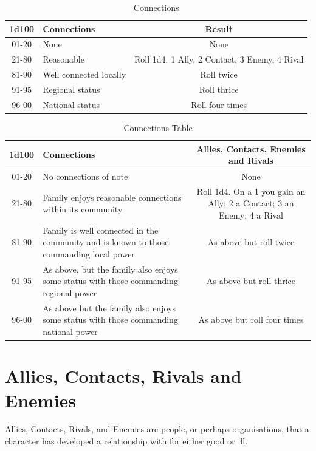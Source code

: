 \documentclass[10pt]{article}
\begin{document}
\begin{longtable}{|c|l|c|}
\caption{Connections}
\label{tab:connections}\\
\hline
\textbf{1d100} & \textbf{Connections} & \textbf{Result} \\
\hline
01-20 & None & None \\
\hline
21-80 & Reasonable & Roll 1d4: 1 Ally, 2 Contact, 3 Enemy, 4 Rival \\
\hline
81-90 & Well connected locally & Roll twice \\
\hline
91-95 & Regional status & Roll thrice \\
\hline
96-00 & National status & Roll four times \\
\hline
\end{longtable}

\begin{longtable}{|c|l|c|}
\caption{Connections Table}
\label{tab:connections}\\
\hline
\textbf{1d100} & \textbf{Connections} & \textbf{Allies, Contacts, Enemies and Rivals} \\
\hline
01-20 & No connections of note & None \\
\hline
21-80 & Family enjoys reasonable connections within its community & Roll 1d4. On a 1 you gain an Ally; 2 a Contact; 3 an Enemy; 4 a Rival \\
\hline
81-90 & Family is well connected in the community and is known to those commanding local power & As above but roll twice \\
\hline
91-95 & As above, but the family also enjoys some status with those commanding regional power & As above but roll thrice \\
\hline
96-00 & As above but the family also enjoys some status with those commanding national power & As above but roll four times \\
\hline
\end{longtable}

\section{Allies, Contacts, Rivals and Enemies}
\label{sec:personal-connections}

Allies, Contacts, Rivals, and Enemies are people, or perhaps organisations, that a character has developed a relationship with for either good or ill. 
\end{document}

